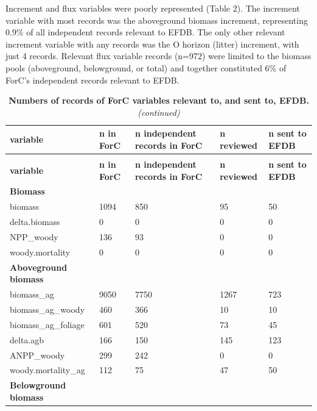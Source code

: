 \documentclass[, manuscript]{copernicus}
\begin{document}
Increment and flux variables were poorly represented (Table 2). The
increment variable with most records was the aboveground biomass
increment, representing 0.9\% of all independent records relevant to
EFDB. The only other relevant increment variable with any records was
the O horizon (litter) increment, with just 4 records. Relevant flux
variable records (n=972) were limited to the biomass pools (aboveground,
belowground, or total) and together constituted 6\% of ForC's
independent records relevant to EFDB.

\newpage
\begingroup\fontsize{8}{10}\selectfont

\begin{longtable}[t]{l|l|l|l|l}
\caption{\label{tab:table_variables}\textbf{Numbers of records of ForC variables relevant to, and sent to, EFDB.}}\\
\hline
\textbf{variable} & \textbf{n in ForC} & \textbf{n independent records in ForC} & \textbf{n reviewed} & \textbf{n sent to EFDB}\\
\hline
\endfirsthead
\caption[]{\textbf{Numbers of records of ForC variables relevant to, and sent to, EFDB.} \textit{(continued)}}\\
\hline
\textbf{variable} & \textbf{n in ForC} & \textbf{n independent records in ForC} & \textbf{n reviewed} & \textbf{n sent to EFDB}\\
\hline
\endhead
\textbf{Biomass} & \textbf{} & \textbf{} & \textbf{} & \textbf{}\\
\hline
biomass & 1094 & 850 & 95 & 50\\
\hline
delta.biomass & 0 & 0 & 0 & 0\\
\hline
NPP\_woody & 136 & 93 & 0 & 0\\
\hline
woody.mortality & 0 & 0 & 0 & 0\\
\hline
\textbf{Aboveground biomass} & \textbf{} & \textbf{} & \textbf{} & \textbf{}\\
\hline
biomass\_ag & 9050 & 7750 & 1267 & 723\\
\hline
biomass\_ag\_woody & 460 & 366 & 10 & 10\\
\hline
biomass\_ag\_foliage & 601 & 520 & 73 & 45\\
\hline
delta.agb & 166 & 150 & 145 & 123\\
\hline
ANPP\_woody & 299 & 242 & 0 & 0\\
\hline
woody.mortality\_ag & 112 & 75 & 47 & 50\\
\hline
\textbf{Belowground biomass} & \textbf{} & \textbf{} & \textbf{} & \textbf{}\\

\end{longtable}
\end{document}
